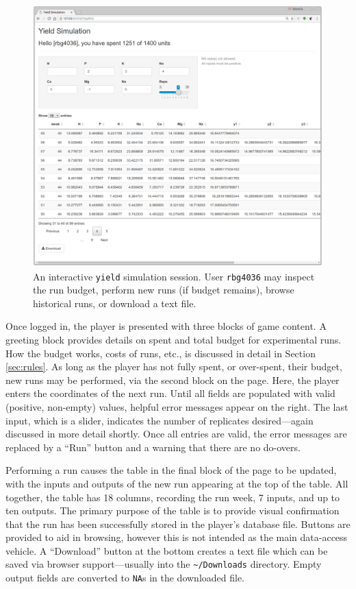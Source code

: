 \documentclass[12pt]{article}
\begin{document}
\begin{figure}[ht!]
\centering
\includegraphics[scale=0.31]{app}
\caption{An interactive {\tt yield} simulation session. User {\tt rbg4036} may
inspect the run budget, perform new runs (if budget remains), browse
historical runs, or download a text file.}
\label{f:app}
\end{figure}

Once logged in, the player is presented with three blocks of game content. A
greeting block provides details on spent and total budget for experimental
runs.  How the budget works, costs of runs, etc., is discussed in detail in
Section \ref{sec:rules}.  As long as the player has not fully spent, or
over-spent, their budget, new runs may be performed, via the second block on
the page. Here, the player enters the coordinates of the next run.  Until all
fields are populated with valid (positive, non-empty) values, helpful error
messages appear on the right.  The last input, which is a slider, indicates
the number of replicates desired---again discussed in more detail
shortly. Once all entries are valid, the error messages are replaced by a
``Run'' button and a warning that there are no do-overs.

Performing a run causes the table in the final block of the page to be
updated, with the inputs and outputs of the new run appearing at the top of
the table.  All together, the table has 18 columns, recording the run week, 7
inputs, and up to ten outputs.  The primary purpose of the table is to provide
visual confirmation that the run has been successfully stored in the player's
database file. Buttons are provided to aid in browsing, however this is not
intended as the main data-access vehicle.  A ``Download'' button at the bottom
creates a text file which can be saved via browser support---usually into the
\verb|~/Downloads| directory. Empty output fields are converted to {\tt NA}s
in the downloaded file.
\end{document}
